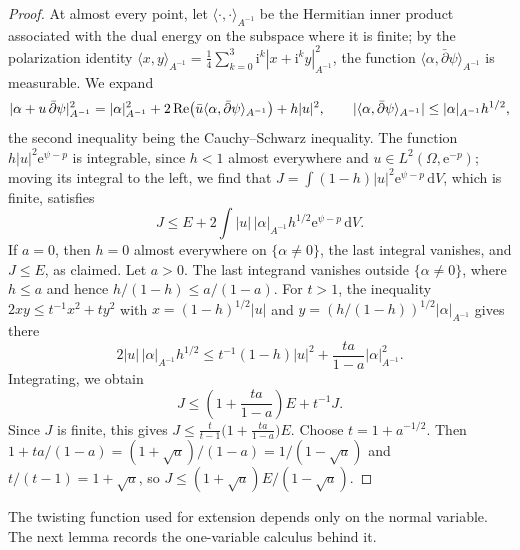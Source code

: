 \begin{proof}
At almost every point, let $\langle\cdot,\cdot\rangle_{A^{-1}}$ be the Hermitian inner product associated with the dual energy on the subspace where it is finite; by the polarization identity $\langle x,y\rangle_{A^{-1}}=\frac14\sum_{k=0}^3\mathrm i^k|x+\mathrm i^ky|_{A^{-1}}^2$, the function $\langle\alpha,\bar\partial\psi\rangle_{A^{-1}}$ is measurable. We expand
\[
 |\alpha+u\,\bar\partial\psi|_{A^{-1}}^2=|\alpha|_{A^{-1}}^2+2\operatorname{Re}\bigl(\bar u\langle\alpha,\bar\partial\psi\rangle_{A^{-1}}\bigr)+h|u|^2,
 \qquad|\langle\alpha,\bar\partial\psi\rangle_{A^{-1}}|\le|\alpha|_{A^{-1}}h^{1/2},
\]
the second inequality being the Cauchy--Schwarz inequality. The function $h|u|^2\mathrm e^{\psi-p}$ is integrable, since $h<1$ almost everywhere and $u\in L^2(\Omega,\mathrm e^{-p})$; moving its integral to the left, we find that $J=\int(1-h)|u|^2\mathrm e^{\psi-p}\,\mathrm dV$, which is finite, satisfies
\[
 J\le E+2\int|u|\,|\alpha|_{A^{-1}}h^{1/2}\mathrm e^{\psi-p}\,\mathrm dV.
\]
If $a=0$, then $h=0$ almost everywhere on $\{\alpha\ne0\}$, the last integral vanishes, and $J\le E$, as claimed. Let $a>0$. The last integrand vanishes outside $\{\alpha\ne0\}$, where $h\le a$ and hence $h/(1-h)\le a/(1-a)$. For $t>1$, the inequality $2xy\le t^{-1}x^2+ty^2$ with $x=(1-h)^{1/2}|u|$ and $y=(h/(1-h))^{1/2}|\alpha|_{A^{-1}}$ gives there
\[
 2|u|\,|\alpha|_{A^{-1}}h^{1/2}\le t^{-1}(1-h)|u|^2+\frac{ta}{1-a}|\alpha|_{A^{-1}}^2.
\]
Integrating, we obtain
\[
 J\le\left(1+\frac{ta}{1-a}\right)E+t^{-1}J.
\]
Since $J$ is finite, this gives $J\le\frac t{t-1}\bigl(1+\frac{ta}{1-a}\bigr)E$. Choose $t=1+a^{-1/2}$. Then $1+ta/(1-a)=(1+\sqrt a)/(1-a)=1/(1-\sqrt a)$ and $t/(t-1)=1+\sqrt a$, so $J\le(1+\sqrt a)E/(1-\sqrt a)$.
\end{proof}

The twisting function used for extension depends only on the normal variable. The next lemma records the one-variable calculus behind it.

